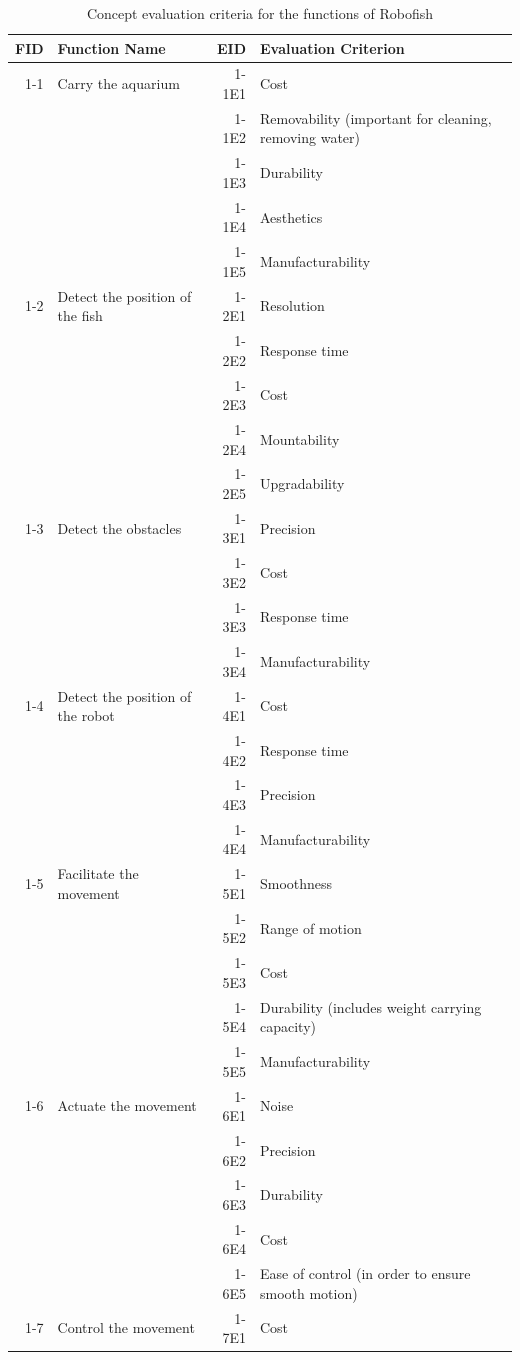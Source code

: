 \documentclass[a4paper, 10pt, DIV=16, parskip = full, twocolumn = true]{scrartcl}
\begin{document}
\begin{table}
	\centering
	\caption{Concept evaluation criteria for the functions of Robofish}
	\begin{tabular}{rlrl}
		\toprule
		FID & Function Name & EID & Evaluation Criterion \\
		\midrule
		1-1 & Carry the aquarium & 1-1E1 & Cost\\	
		& & 1-1E2 & Removability (important for cleaning, removing water)\\	
		& & 1-1E3 & Durability \\	
		& & 1-1E4 & Aesthetics \\	
		& & 1-1E5 & Manufacturability \\	
		1-2 & Detect the position of the fish & 1-2E1 & Resolution \\
		& & 1-2E2 & Response time \\	
		& & 1-2E3 & Cost \\	
		& & 1-2E4 & Mountability \\	
		& & 1-2E5 & Upgradability \\	
		1-3 & Detect the obstacles & 1-3E1 & Precision \\
		& & 1-3E2 & Cost \\	
		& & 1-3E3 & Response time \\
		& & 1-3E4 & Manufacturability \\
		1-4 & Detect the position of the robot & 1-4E1 & Cost \\
		& & 1-4E2 & Response time \\	
		& & 1-4E3 & Precision \\
		& & 1-4E4 & Manufacturability \\
		1-5 & Facilitate the movement & 1-5E1 & Smoothness \\
		& & 1-5E2 & Range of motion \\	
		& & 1-5E3 & Cost  \\
		& & 1-5E4 & Durability (includes weight carrying capacity) \\	
		& & 1-5E5 & Manufacturability \\
		1-6 & Actuate the movement & 1-6E1 & Noise \\
		& & 1-6E2 & Precision \\	
		& & 1-6E3 & Durability \\
		& & 1-6E4 & Cost \\
		& & 1-6E5 & Ease of control (in order to ensure smooth motion) \\
		1-7 & Control the movement & 1-7E1 & Cost \\

\end{tabular}
\end{table}
\end{document}
